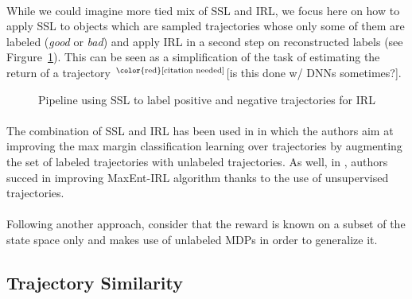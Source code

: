 \documentclass{article}
\newcommand{\needcite}{${}^{\text{\color{red}[citation needed]}}$}
\begin{document}
\paragraph{}
While we could imagine more tied mix of SSL and IRL, we focus here on how to apply SSL to objects which are sampled trajectories whose only some of them are labeled (\emph{good} or \emph{bad}) and apply IRL in a second step on reconstructed labels (see Firgure~\ref{fig:pipeline}). This can be seen as a simplification of the task of estimating the return of a trajectory \needcite [is this done w/ DNNs sometimes?].

\begin{figure}
\begin{center}
\end{center}
\caption{Pipeline using SSL to label positive and negative trajectories for IRL\label{fig:pipeline}}
\end{figure}

\paragraph{}
The combination of SSL and IRL has been used in \cite{Valko12} in which the authors aim at improving the max margin classification learning over trajectories by augmenting the set of labeled trajectories with unlabeled trajectories. As well, in \cite{Audiffren15}, authors succed in improving MaxEnt-IRL algorithm thanks to the use of unsupervised trajectories.

\paragraph{}
Following another approach, \cite{Finn17} consider that the reward is known on a subset of the state space only and makes use of unlabeled MDPs in order to generalize it.

\subsection{Trajectory Similarity}
\end{document}

